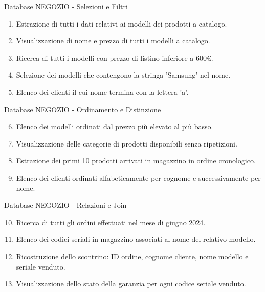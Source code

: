 \documentclass{beamer}
\begin{document}
\begin{frame}{Database NEGOZIO - Selezioni e Filtri}

    \vfill
    \begin{enumerate}
        \item Estrazione di tutti i dati relativi ai modelli dei prodotti a catalogo.
        \item Visualizzazione di nome e prezzo di tutti i modelli a catalogo.
        \item Ricerca di tutti i modelli con prezzo di listino inferiore a 600€.
        \item Selezione dei modelli che contengono la stringa 'Samsung' nel nome.
        \item Elenco dei clienti il cui nome termina con la lettera 'a'.
    \end{enumerate}
    \vfill
\end{frame}

\begin{frame}{Database NEGOZIO - Ordinamento e Distinzione}

    \vfill
    \begin{enumerate}
        \setcounter{enumi}{5}
        \item Elenco dei modelli ordinati dal prezzo più elevato al più basso.
        \item Visualizzazione delle categorie di prodotti disponibili senza ripetizioni.
        \item Estrazione dei primi 10 prodotti arrivati in magazzino in ordine cronologico.
        \item Elenco dei clienti ordinati alfabeticamente per cognome e successivamente per nome.
    \end{enumerate}
    \vfill
\end{frame}

\begin{frame}{Database NEGOZIO - Relazioni e Join}

    \vfill
    \begin{enumerate}
        \setcounter{enumi}{9}
        \item Ricerca di tutti gli ordini effettuati nel mese di giugno 2024.
        \item Elenco dei codici seriali in magazzino associati al nome del relativo modello.
        \item Ricostruzione dello scontrino: ID ordine, cognome cliente, nome modello e seriale venduto.
        \item Visualizzazione dello stato della garanzia per ogni codice seriale venduto.
    \end{enumerate}
    \vfill
\end{frame}
\end{document}

